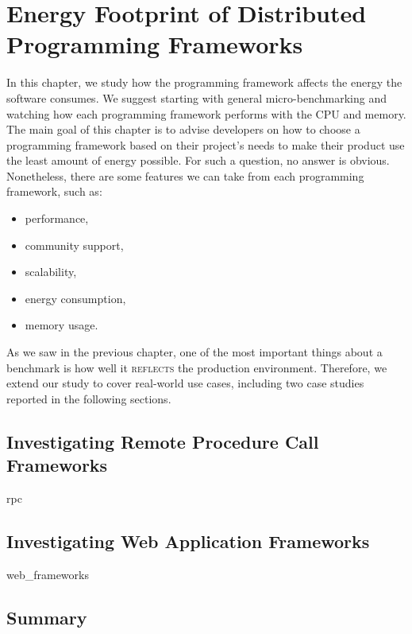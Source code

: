 \chapter{Energy Footprint of Distributed Programming Frameworks}
\label{chapter:porgramming_langauges}
In this chapter, we study how the programming framework affects the energy the software consumes.
We suggest starting with general micro-benchmarking and watching how each programming framework performs with the CPU and memory.
The main goal of this chapter is to advise developers on how to choose a programming framework based on their project's needs to make their product use the least amount of energy possible.
For such a question, no answer is obvious.
Nonetheless, there are some features we can take from each programming framework, such as:
\begin{itemize}
    \item performance,
    \item community support,
    \item scalability,
    \item energy consumption,
    \item memory usage.
\end{itemize}

As we saw in the previous chapter, one of the most important things about a benchmark is how well it \textsc{reflects} the production environment.
Therefore, we extend our study to cover real-world use cases, including two case studies reported in the following sections.

\section{Investigating Remote Procedure Call Frameworks}
{rpc}


\section{Investigating Web Application Frameworks}
{web_frameworks}

\section{Summary }
